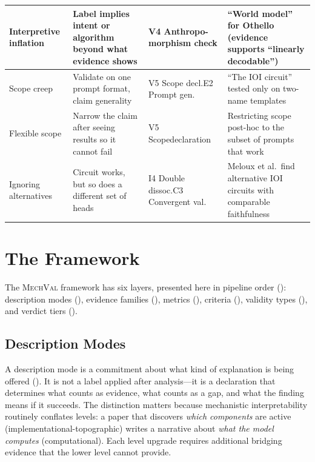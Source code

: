 \documentclass[10pt]{article}
\newcommand{\mechval}{\textsc{MechVal}}
\begin{document}
\begin{table}[H]
\begin{tabular}{@{}l>{\raggedright\arraybackslash}p{3.2cm}>{\raggedright\arraybackslash}p{2.8cm}>{\raggedright\arraybackslash}p{4.0cm}@{}}
\midrule
Interpretive inflation & Label implies intent or algorithm beyond what evidence shows & V4 Anthropo-\newline morphism check & ``World model'' for Othello (evidence supports ``linearly decodable'') \\
\midrule
Scope creep & Validate on one prompt format, claim generality & V5 Scope decl.\newline E2 Prompt gen. & ``The IOI circuit'' tested only on two-name templates \\
\midrule
Flexible scope & Narrow the claim after seeing results so it cannot fail & V5 Scope\newline declaration & Restricting scope post-hoc to the subset of prompts that work \\
\midrule
Ignoring alternatives & Circuit works, but so does a different set of heads & I4 Double dissoc.\newline C3 Convergent val. & Meloux et al.\ find alternative IOI circuits with comparable faithfulness \\
\bottomrule
\end{tabular}
\end{table}
\endgroup


\section{The Framework}
\label{sec:framework}

The \mechval{} framework has six layers, presented here in pipeline order (): description modes (), evidence families (), metrics (), criteria (), validity types (), and verdict tiers ().

\subsection{Description Modes}
\label{sec:description-modes}

A description mode is a commitment about what kind of explanation is being offered (). It is not a label applied after analysis---it is a declaration that determines what counts as evidence, what counts as a gap, and what the finding means if it succeeds. The distinction matters because mechanistic interpretability routinely conflates levels: a paper that discovers \emph{which components} are active (implementational-topographic) writes a narrative about \emph{what the model computes} (computational). Each level upgrade requires additional bridging evidence that the lower level cannot provide.
\end{document}
